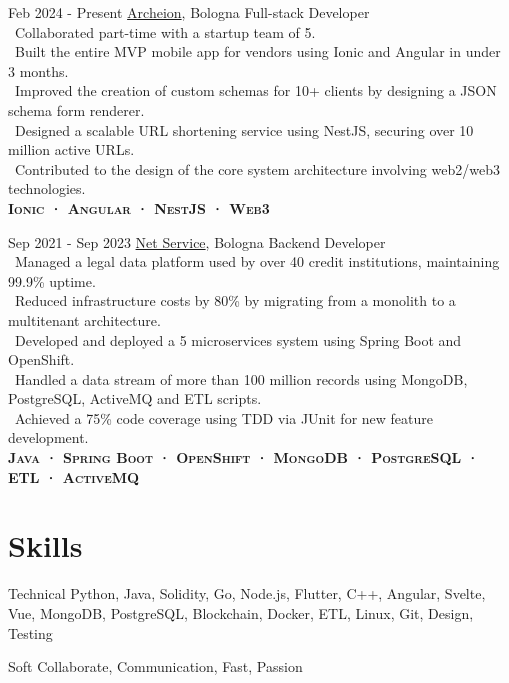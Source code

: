 \documentclass{tccv}
\begin{document}
\begin{eventlist}

     \item{Feb 2024 - Present}
     {\href{https://archeion.tech/}{Archeion}, Bologna}
     {Full-stack Developer} \\
     \textbullet~Collaborated part-time with a startup team of 5. \\
     \textbullet~Built the entire MVP mobile app for vendors using Ionic and Angular in under 3 months. \\
     \textbullet~Improved the creation of custom schemas for 10+ clients by designing a JSON schema form renderer. \\
     \textbullet~Designed a scalable URL shortening service using NestJS, securing over 10 million active URLs. \\
     \textbullet~Contributed to the design of the core system architecture involving web2/web3 technologies. \\
     \textbf{\textsc{Ionic · Angular · NestJS · Web3}}

     \item{Sep 2021 - Sep 2023}
     {\href{https://www.netservice.eu/}{Net Service}, Bologna}
     {Backend Developer} \\
     \textbullet~Managed a legal data platform used by over 40 credit institutions, maintaining 99.9\% uptime. \\
     \textbullet~Reduced infrastructure costs by 80\% by migrating from a monolith to a multitenant architecture. \\
     \textbullet~Developed and deployed a 5 microservices system using Spring Boot and OpenShift. \\
     \textbullet~Handled a data stream of more than 100 million records using MongoDB, PostgreSQL, ActiveMQ and ETL scripts. \\
     \textbullet~Achieved a 75\% code coverage using TDD via JUnit for new feature development. \\
     \textbf{\textsc{Java · Spring Boot · OpenShift · MongoDB · PostgreSQL · ETL · ActiveMQ}}

\end{eventlist}


\section{Skills}

\begin{factlist}

\item{Technical}
     {Python, Java, Solidity, Go, Node.js, Flutter, C++, Angular, Svelte, Vue, MongoDB, PostgreSQL, Blockchain, Docker, ETL, Linux, Git, Design, Testing}

\item{Soft}
     {Collaborate, Communication, Fast, Passion}

\end{factlist}
\end{document}
